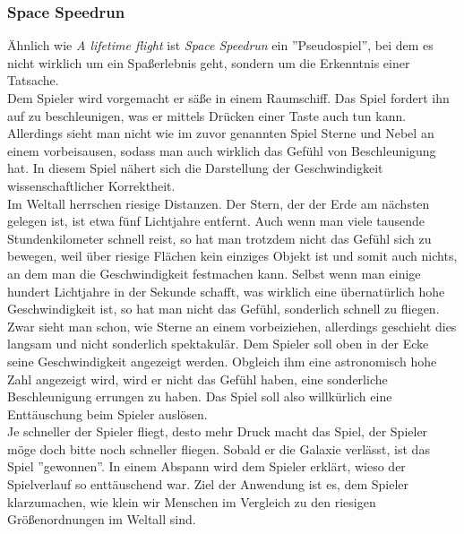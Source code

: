 \documentclass{Ausarbeitung}
\begin{document}
		\subsubsection{Space Speedrun}
			Ähnlich wie \textit{A lifetime flight} ist \textit{Space Speedrun} ein ''Pseudospiel'', bei dem es nicht wirklich um ein Spaßerlebnis geht, sondern um die Erkenntnis einer Tatsache. \\
			Dem Spieler wird vorgemacht er säße in einem Raumschiff. Das Spiel fordert ihn auf zu beschleunigen, was er mittels Drücken einer Taste auch tun kann. Allerdings sieht man nicht wie im zuvor genannten Spiel Sterne und Nebel an einem vorbeisausen, sodass man auch wirklich das Gefühl von Beschleunigung hat. In diesem Spiel nähert sich die Darstellung der Geschwindigkeit wissenschaftlicher Korrektheit. \\
			Im Weltall herrschen riesige Distanzen. Der Stern, der der Erde am nächsten gelegen ist, ist etwa fünf Lichtjahre entfernt. Auch wenn man viele tausende Stundenkilometer schnell reist, so hat man trotzdem nicht das Gefühl sich zu bewegen, weil über riesige Flächen kein einziges Objekt ist und somit auch nichts, an dem man die Geschwindigkeit festmachen kann. Selbst wenn man einige hundert Lichtjahre in der Sekunde schafft, was wirklich eine übernatürlich hohe Geschwindigkeit ist, so hat man nicht das Gefühl, sonderlich schnell zu fliegen. Zwar sieht man schon, wie Sterne an einem vorbeiziehen, allerdings geschieht dies langsam und nicht sonderlich spektakulär.
			Dem Spieler soll oben in der Ecke seine Geschwindigkeit angezeigt werden. Obgleich ihm eine astronomisch hohe Zahl angezeigt wird, wird er nicht das Gefühl haben, eine sonderliche Beschleunigung errungen zu haben. Das Spiel soll also willkürlich eine Enttäuschung beim Spieler auslösen. \\
			Je schneller der Spieler fliegt, desto mehr Druck macht das Spiel, der Spieler möge doch bitte noch schneller fliegen. Sobald er die Galaxie verlässt, ist das Spiel ''gewonnen''. In einem Abspann wird dem Spieler erklärt, wieso der Spielverlauf so enttäuschend war. Ziel der Anwendung ist es, dem Spieler klarzumachen, wie klein wir Menschen im Vergleich zu den riesigen Größenordnungen im Weltall sind.
			
\end{document}

